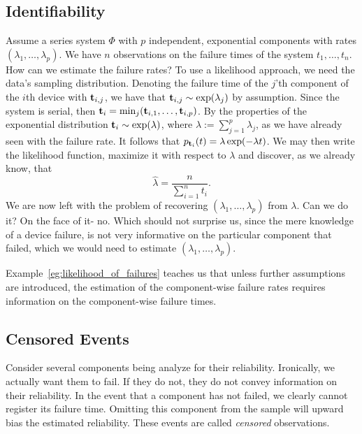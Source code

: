 \subsection{Identifiability}

\begin{example}
\label{eg:likelihood_of_failures}
Assume a series system $\Phi$ with $p$ independent, exponential components with rates $(\lambda_1,\dots,\lambda_p)$.
We have $n$ observations on the failure times of the system $t_1,\dots,t_n$.
How can we estimate the failure rates?
To use a likelihood approach, we need the data's sampling distribution.
Denoting the failure time of the $j$'th component of the $i$th device with $\mathbf{t}_{i,j}$, we have that $\mathbf{t}_{i,j}\sim \exp(\lambda_j)$ by assumption.
Since the system is serial, then $\mathbf{t}_i=\min_j(\mathbf{t}_{i,1},\dots,\mathbf{t}_{i,p})$.
By the properties of the exponential distribution $\mathbf{t}_i \sim \exp(\lambda)$, where $\lambda:=\sum_{j=1}^{p} \lambda_j$, as we have already seen with the failure rate. It follows that
$p_{\mathbf{t}_i} (t)=\lambda \exp(-\lambda t)$.
We may then write the likelihood function, maximize it with respect to $\lambda$ and discover, as we already know, that $$\hat{\lambda}=\frac{n}{\sum_{i=1}^{n} t_i}.$$
We are now left with the problem of recovering $(\lambda_1,\dots,\lambda_p)$ from $\lambda$. 
Can we do it? On the face of it- no. Which should not surprise us, since the mere knowledge of a device failure, is not very informative on the particular component that failed, which we would need to estimate $(\lambda_1,\dots,\lambda_p)$.
\end{example}

Example~\ref{eg:likelihood_of_failures} teaches us that unless further assumptions are introduced, the estimation of the component-wise failure rates requires information on the component-wise failure times. 





\subsection{Censored Events}
Consider several components being analyze for their reliability. 
Ironically, we actually want them to fail. If they do not, they do not convey information on their reliability.
In the event that a component has not failed, we clearly cannot register its failure time. 
Omitting this component from the sample will upward bias the estimated reliability.
These events are called \emph{censored} observations. 

